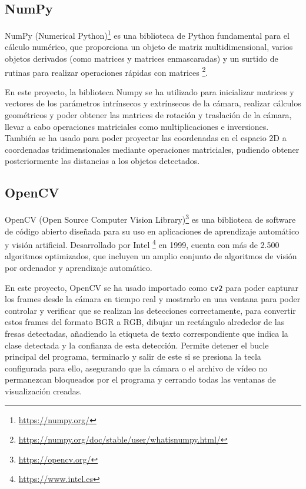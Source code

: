 \subsection{NumPy}
\label{sec:NumPy}

NumPy (Numerical Python)\footnote{\url{https://numpy.org/}} es una biblioteca de Python fundamental para el cálculo numérico, que proporciona un objeto de matriz multidimensional, varios objetos derivados (como matrices y matrices enmascaradas) y un surtido de rutinas para realizar operaciones rápidas con matrices \footnote{\url{https://numpy.org/doc/stable/user/whatisnumpy.html/}}.

En este proyecto, la biblioteca Numpy se ha utilizado para inicializar matrices y vectores de los parámetros intrínsecos y extrínsecos de la cámara, realizar cálculos geométricos y poder obtener las matrices de rotación y traslación de la cámara, llevar a cabo operaciones matriciales como multiplicaciones e inversiones. También se ha usado para poder proyectar las coordenadas en el espacio 2D a coordenadas tridimensionales mediante operaciones matriciales, pudiendo obtener posteriormente las distancias a los objetos detectados. 

\subsection{OpenCV}
\label{sec:OpenCV}

OpenCV (Open Source Computer Vision Library)\footnote{\url{https://opencv.org/}} es una biblioteca de software de código abierto diseñada para su uso en aplicaciones de aprendizaje automático y visión artificial. Desarrollado por Intel \footnote{\url{https://www.intel.es}} en 1999, cuenta con más de 2.500 algoritmos optimizados, que incluyen un amplio conjunto de algoritmos de visión por ordenador y aprendizaje automático. %

\pagebreak
En este proyecto, OpenCV se ha usado importado como \texttt{cv2} para poder capturar los frames desde la cámara en tiempo real y mostrarlo en una ventana para poder controlar y verificar que se realizan las detecciones correctamente, para convertir estos frames del formato BGR a RGB, dibujar un rectángulo alrededor de las fresas detectadas, añadiendo la etiqueta de texto correspondiente que indica la clase detectada y la confianza de esta detección. Permite detener el bucle principal del programa, terminarlo y salir de este si se presiona la tecla configurada para ello, asegurando que la cámara o el archivo de vídeo no permanezcan bloqueados por el programa y cerrando todas las ventanas de visualización creadas.

